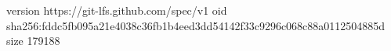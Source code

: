 version https://git-lfs.github.com/spec/v1
oid sha256:fddc5fb095a21e4038c36fb1b4eed3dd54142f33c9296c068c88a0112504885d
size 179188
